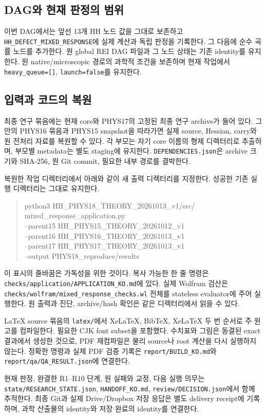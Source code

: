 \subsection{DAG와 현재 판정의 범위}

이번 DAG에서는 앞선 13개 HH 노드 값을 그대로 보존하고
\texttt{HH\_DEFECT\_MIXED\_RESPONSE}에 실제 계산과 독립 판정을 기록한다.
그 다음에 순수 곡률 노드를 추가한다. 원 global REI DAG 파일과
그 노드 상태는 기존 identity를 유지한다.
원 native/microscopic 경로의 과학적 조건을 보존하며 현재 작업에서
\texttt{heavy\_queue=[]}, \texttt{launch=false}를 유지한다.

\subsection{입력과 코드의 복원}

최종 연구 묶음에는 현재 core와 PHYS17의 고정된 최종 연구 archive가
들어 있다. 그 안의 PHYS16 묶음과 PHYS15 snapshot을 따라가면 실제
source, Hessian, carry와 원 전처리 자료를 복원할 수 있다.
각 부모는 자기 core 이름의 형제 디렉터리로 추출하며,
부모별 metadata는 별도 staging에 유지한다.
\nolinkurl{DEPENDENCIES.json}은 archive 크기와 SHA-256,
원 Git commit, 필요한 내부 경로를 결박한다.

\noindent\begin{minipage}{\linewidth}
복원한 작업 디렉터리에서 아래와 같이 새 출력 디렉터리를 지정한다.
성공한 기존 실행 디렉터리는 그대로 유지한다.
\begin{quote}\small
\ttfamily
python3 HH\_PHYS18\_THEORY\_20261013\_v1/src/\\
mixed\_response\_application.py \\
\quad --parent15 HH\_PHYS15\_THEORY\_20261012\_v1 \\
\quad --parent16 HH\_PHYS16\_THEORY\_20261013\_v1 \\
\quad --parent17 HH\_PHYS17\_THEORY\_20261013\_v1 \\
\quad --output PHYS18\_reproduce/results
\end{quote}
\end{minipage}\par
이 표시의 줄바꿈은 가독성을 위한 것이다. 복사 가능한 한 줄 명령은
\nolinkurl{checks/application/APPLICATION_KO.md}에 있다.
실제 Wolfram 검산은
\nolinkurl{checks/wolfram/mixed_response_checks.wl} 전체를
stateless evaluator에 주어 실행한다. 원 출력과 진단, archive/hash
확인은 같은 디렉터리에서 읽을 수 있다.

LaTeX source 묶음의 \texttt{latex/}에서 XeLaTeX, BibTeX, XeLaTeX 두 번
순서로 주 원고를 컴파일한다. 필요한 CJK font subset을 포함했다.
수치표와 그림은 동결된 exact 결과에서 생성한 것으로, PDF 재컴파일은
물리 source나 root 계산을 다시 실행하지 않는다.
정확한 명령과 실제 PDF 검증 기록은 \nolinkurl{report/BUILD_KO.md}와
\nolinkurl{report/qa/QA_RESULT.json}에 연결한다.

현재 판정, 완결한 R1--R10 단계, 원 실패와 교정, 다음 실행 의무는
\nolinkurl{state/RESEARCH_STATE.json}, \nolinkurl{HANDOFF_KO.md},
\nolinkurl{review/DECISION.json}에서 함께 추적한다.
최종 Git과 실제 Drive/Dropbox 저장 응답은 별도 delivery receipt에
기록하며, 과학 산출물의 identity와 저장 완료의 identity를 연결한다.
